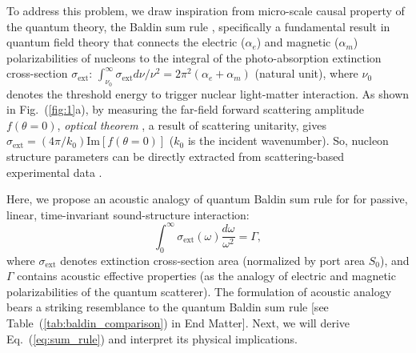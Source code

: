 \documentclass[final,5p,times,twocolumn]{elsarticle}
\begin{document}
To address this problem, we draw inspiration from micro-scale causal property of the quantum theory, the Baldin sum rule \cite{BALDIN1960310}, specifically a fundamental result in quantum field theory that connects the electric ($\alpha_e$) and magnetic ($\alpha_m$) polarizabilities of nucleons to the integral of the photo-absorption extinction cross-section $\sigma_\mathrm{ext}$: $\int_{\nu_0}^{\infty} \sigma_\mathrm{ext}  {d\nu/\nu^2} = 2 \pi^2(\alpha_e + \alpha_m)$ (natural unit),
where $\nu_0$ denotes the threshold energy to trigger nuclear light-matter interaction. As shown in Fig.~(\ref{fig:1}a), by measuring the far-field forward scattering amplitude $f(\theta=0)$, \textit{optical theorem} \cite{gustafsson2012optical}, a result of scattering unitarity, gives $\sigma_\mathrm{ext}=(4\pi/k_0)\mathrm{Im}[f(\theta=0)]$ ($k_0$ is the incident wavenumber). So, nucleon structure parameters can be directly extracted from scattering-based experimental data \cite{schumacher2005polarizability,holstein2014hadron}.

Here, we propose an acoustic analogy of quantum Baldin sum rule for for passive, linear, time-invariant sound-structure interaction:
\begin{equation} \label{eq:sum_rule}
	\int_0^{\infty} \sigma_\mathrm{ext}(\omega) \frac{d \omega}{\omega^2} = \Gamma,
\end{equation}
where $\sigma_\mathrm{ext}$ denotes extinction cross-section area (normalized by port area $S_0$), and $\Gamma$ contains acoustic effective properties (as the analogy of electric and magnetic polarizabilities of the quantum scatterer). The formulation of acoustic analogy bears a striking resemblance to the quantum Baldin sum rule [see Table~(\ref{tab:baldin_comparison}) in End Matter]. Next, we will derive Eq.~(\ref{eq:sum_rule}) and interpret its physical implications.
\end{document}
